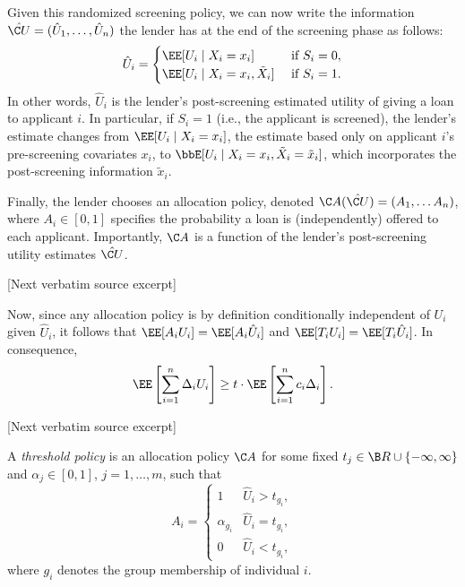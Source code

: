 \documentclass[10pt]{article}
\begin{document}
\begin{ReviewVerbatim}
Given this randomized screening policy, we can now write the information \(\hat {\C U} = (\hat U_1, \ldots, \hat U_n)\) the lender has at the end of the screening phase as follows:
    \begin{equation}
        \hat U_i = \begin{cases}
            \EE[U_i \mid X_i = x_i] & \text{ if } S_i = 0, \\
            \EE[U_i \mid X_i = x_i, \tilde{X}_i] & \text{ if } S_i =1.
        \end{cases}
    \end{equation}
In other words, \(\hat U_i\) is the lender's post-screening estimated utility of giving a loan to applicant \(i\).
In particular, if \(S_i = 1\) (i.e., the applicant is screened), the lender's estimate changes from \(\EE[U_i\mid X_i = x_i]\),
the estimate based only on applicant \(i\)'s pre-screening covariates \(x_i\),
to
\(\bbE[U_i \mid X_i = x_i, \tilde{X}_i = \tilde{x}_i] \), which incorporates the post-screening information \(\tilde{x}_i\).

Finally, the lender chooses an allocation policy, denoted \(\C A(\hat {\C U}) = (A_1, \dots A_n)\),
where \(A_i \in [0,1]\)
specifies the probability a loan is (independently) offered to each applicant.
Importantly, \(\C A\) is a function of
the lender's post-screening utility estimates
\(\hat {\C U}\).

[Next verbatim source excerpt]

Now, since any allocation policy is by definition conditionally independent of \(U_i\) given \(\hat U_i\), it follows that \(\EE [A_i U_i] = \EE [A_i \hat U_i]\) and \(\EE [T_i U_i] = \EE [T_i \hat U_i]\). In consequence,
\begin{equation}
    \label{eq:key}
        \EE \left[ \sum_{i = 1}^n \Delta_i U_i \right] \geq t \cdot \EE \left[ \sum_{i = 1}^n c_i \Delta_i \right].
    \end{equation}

[Next verbatim source excerpt]

\begin{defn}
    A \emph{threshold policy} is an allocation policy \(\C A\) for some fixed \(t_j \in \B R \cup \{-\infty, \infty\}\) and \(\alpha_j \in [0,1]\), \(j = 1, \ldots, m\), such that
        \begin{equation*}
            A_i = \begin{cases}
                1 & \hat U_i > t_{g_i},\\
                \alpha_{g_i} & \hat U_i = t_{g_i}, \\
                0 & \hat U_i < t_{g_i},
            \end{cases}
        \end{equation*}
    where \(g_i\) denotes the group membership of individual \(i\).
\end{defn}
\end{ReviewVerbatim}
\end{document}
